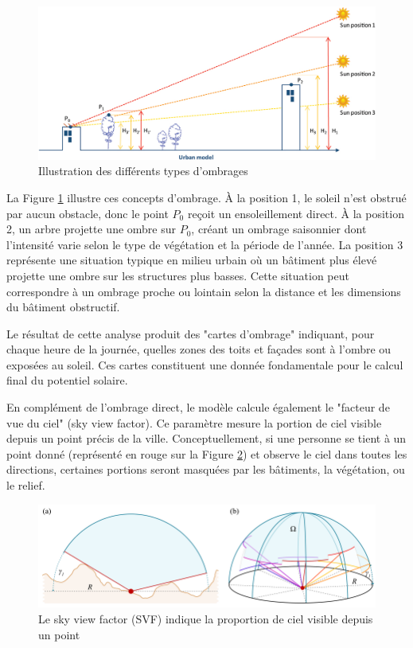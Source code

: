 \begin{figure}[H]
    \centering
    \includegraphics[width=1.00\linewidth]{02-main/figures/cadastre_solaire_ombrage.jpg}
    \caption{Illustration des différents types d'ombrages \cite{desthieux_solar_2018}}
    \label{fig:cadastre_solaire_ombrage}
\end{figure}
\par{La Figure \ref{fig:cadastre_solaire_ombrage} illustre ces concepts d'ombrage. À la position 1, le soleil n'est obstrué par aucun obstacle, donc le point $P_0$ reçoit un ensoleillement direct. À la position 2, un arbre projette une ombre sur $P_0$, créant un ombrage saisonnier dont l'intensité varie selon le type de végétation et la période de l'année. La position 3 représente une situation typique en milieu urbain où un bâtiment plus élevé projette une ombre sur les structures plus basses. Cette situation peut correspondre à un ombrage proche ou lointain selon la distance et les dimensions du bâtiment obstructif.}
\par{Le résultat de cette analyse produit des "cartes d'ombrage" indiquant, pour chaque heure de la journée, quelles zones des toits et façades sont à l'ombre ou exposées au soleil. Ces cartes constituent une donnée fondamentale pour le calcul final du potentiel solaire.}
\par{En complément de l'ombrage direct, le modèle calcule également le "facteur de vue du ciel" (sky view factor). Ce paramètre mesure la portion de ciel visible depuis un point précis de la ville. Conceptuellement, si une personne se tient à un point donné (représenté en rouge sur la Figure \ref{fig:cadastre_solaire_svf}) et observe le ciel dans toutes les directions, certaines portions seront masquées par les bâtiments, la végétation, ou le relief.}
\begin{figure}[H]
    \centering
    \includegraphics[width=1\linewidth]{cadastre_solaire_svf.png}
    \caption{Le sky view factor (SVF) indique la proportion de ciel visible depuis un point \cite{zaksek_sky-view_2011}}
    \label{fig:cadastre_solaire_svf}
\end{figure}
